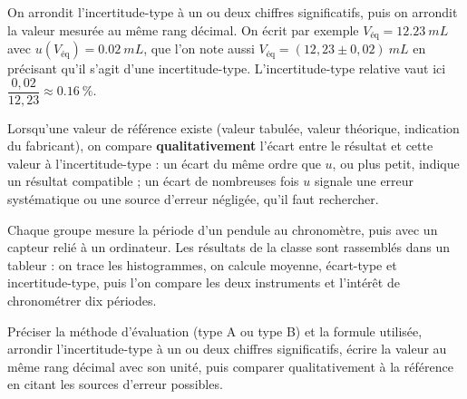 \begin{propriete}
On arrondit l'incertitude-type à un ou deux chiffres significatifs, puis on arrondit la valeur mesurée au même rang décimal. On écrit
par exemple $V_\text{éq}=\qty{12,23}{mL}$ avec $u(V_\text{éq})=\qty{0,02}{mL}$, que l'on note aussi $V_\text{éq}=(12{,}23\pm0{,}02)~\unit{mL}$ en précisant qu'il
s'agit d'une incertitude-type. L'incertitude-type relative vaut ici $\dfrac{0{,}02}{12{,}23}\approx\qty{0,16}{\percent}$.
\end{propriete}
\begin{propriete}
Lorsqu'une valeur de référence existe (valeur tabulée, valeur théorique, indication du fabricant), on compare \textbf{qualitativement}
l'écart entre le résultat et cette valeur à l'incertitude-type : un écart du même ordre que $u$, ou plus petit, indique un résultat
compatible ; un écart de nombreuses fois $u$ signale une erreur systématique ou une source d'erreur négligée, qu'il faut rechercher.
\end{propriete}
\par{}
\begin{experience}
Chaque groupe mesure la période d'un pendule au chronomètre, puis avec un capteur relié à un ordinateur. Les résultats de la classe
sont rassemblés dans un tableur : on trace les histogrammes, on calcule moyenne, écart-type et incertitude-type, puis l'on compare les
deux instruments et l'intérêt de chronométrer dix périodes.
\end{experience}
\begin{rediger}
Préciser la méthode d'évaluation (type A ou type B) et la formule utilisée, arrondir l'incertitude-type à un ou deux chiffres
significatifs, écrire la valeur au même rang décimal avec son unité, puis comparer qualitativement à la référence en citant les
sources d'erreur possibles.
\end{rediger}
\exercices

